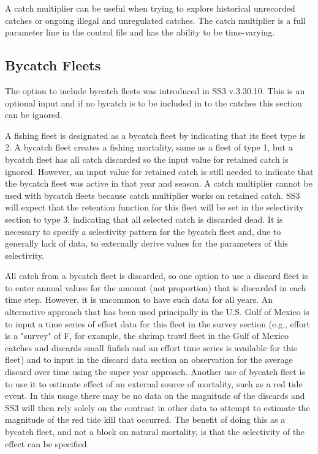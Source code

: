 A catch multiplier can be useful when trying to explore historical unrecorded catches or ongoing illegal and unregulated catches.  The catch multiplier is a full parameter line in the control file and has the ability to be time-varying.  

\subsection{Bycatch Fleets}
The option to include bycatch fleets was introduced in SS3 v.3.30.10.  This is an optional input and if no bycatch is to be included in to the catches this section can be ignored.

A fishing fleet is designated as a bycatch fleet by indicating that its fleet type is 2.  A bycatch fleet creates a fishing mortality, same as a fleet of type 1, but a bycatch fleet has all catch discarded so the input value for retained catch is ignored.  However, an input value for retained catch is still needed to indicate that the bycatch fleet was active in that year and season.  A catch multiplier cannot be used with bycatch fleets because catch multiplier works on retained catch.  SS3 will expect that the retention function for this fleet will be set in the selectivity section to type 3, indicating that all selected catch is discarded dead.  It is necessary to specify a selectivity pattern for the bycatch fleet and, due to generally lack of data, to externally derive values for the parameters of this selectivity.

All catch from a bycatch fleet is discarded, so one option to use a discard fleet is to enter annual values for the amount (not proportion) that is discarded in each time step.  However, it is uncommon to have such data for all years.  An alternative approach that has been used principally in the U.S. Gulf of Mexico is to input a time series of effort data for this fleet in the survey section (e.g.,  effort is a "survey" of F, for example, the shrimp trawl fleet in the Gulf of Mexico catches and discards small finfish and an effort time series is available for this fleet) and to input in the discard data section an observation for the average discard over time using the super year approach.  Another use of bycatch fleet is to use it to estimate effect of an external source of mortality, such as a red tide event.  In this usage there may be no data on the magnitude of the discards and SS3 will then rely solely on the contrast in other data to attempt to estimate the magnitude of the red tide kill that occurred. The benefit of doing this as a bycatch fleet, and not a block on natural mortality, is that the selectivity of the effect can be specified. 

